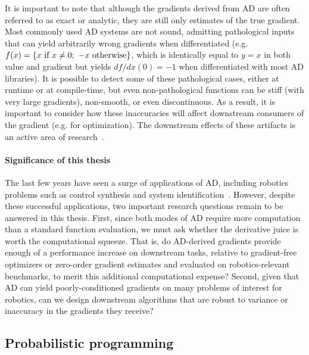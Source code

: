 It is important to note that although the gradients derived from AD are often referred to as exact or analytic, they are still only estimates of the true gradient. Most commonly used AD systems are not sound, admitting pathological inputs that can yield arbitrarily wrong gradients when differentiated (e.g. $f(x) = \left\{x \text{ if } x \neq 0;\ -x \text{ otherwise}\right\}$, which is identically equal to $y = x$ in both value and gradient but yields $df/dx(0) = -1$ when differentiated with most AD libraries). It is possible to detect some of these pathological cases, either at runtime or at compile-time, but even non-pathological functions can be stiff (with very large gradients), non-smooth, or even discontinuous. As a result, it is important to consider how these inaccuracies will affect downstream consumers of the gradient (e.g. for optimization). The downstream effects of these artifacts is an active area of research~\cite{suh2021_bundled_gradients,suhDifferentiableSimulatorsGive2022,metzGradientsAreNot2022}.

\paragraph{Significance of this thesis} The last few years have seen a surge of applications of AD, including robotics problems such as control synthesis and system identification~\cite{xuAcceleratedPolicyLearning2022,agrawalDifferentiableConvexOptimization2019,amosOptNetDifferentiableOptimization2017,belubute_peres_lcp_physics,du2021underwater}. However, despite these successful applications, two important research questions remain to be answered in this thesis. First, since both modes of AD require more computation than a standard function evaluation, we must ask whether the derivative juice is worth the computational squeeze. That is, do AD-derived gradients provide enough of a performance increase on downstream tasks, relative to gradient-free optimizers or zero-order gradient estimates and evaluated on robotics-relevant benchmarks, to merit this additional computational expense? Second, given that AD can yield poorly-conditioned gradients on many problems of interest for robotics, can we design downstream algorithms that are robust to variance or inaccuracy in the gradients they receive?

\subsection{Probabilistic programming}

